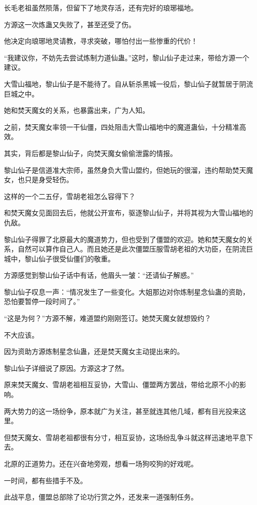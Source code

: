 \begin{this_body}
长毛老祖虽然陨落，但留下了地灵存活，还有完好的琅琊福地。

方源这一次炼蛊又失败了，甚至还受了伤。

他决定向琅琊地灵请教，寻求突破，哪怕付出一些惨重的代价！

“我建议你，不妨先去尝试炼制力道仙蛊。”这时，黎山仙子走过来，带给方源一个建议。

大雪山福地，黎山仙子是不能待了。自从斩杀黑城一役后，黎山仙子就暂居于阴流巨城之中。

她和焚天魔女的关系，也暴露出来，广为人知。

之前，焚天魔女率领一干仙僵，四处阻击大雪山福地中的魔道蛊仙，十分精准高效。

其实，背后都是黎山仙子，向焚天魔女偷偷泄露的情报。

黎山仙子是信道准大宗师，虽然身负大雪山盟约，但她玩的很溜，违约帮助焚天魔女，也只是身受轻伤。

这样的一个二五仔，雪胡老祖怎么容得下？

和焚天魔女见面回去后，他就公开宣布，驱逐黎山仙子，并将其视为大雪山福地的仇敌。

黎山仙子得罪了北原最大的魔道势力，但也受到了僵盟的欢迎。她和焚天魔女的关系，自然可以算作自己人。而且她还是此次僵盟压服雪胡老祖的大功臣，在阴流巨城中，黎山仙子很受仙僵们的敬重。

方源感觉到黎山仙子话中有话，他眉头一皱：“还请仙子解惑。”

黎山仙子叹息一声：“情况发生了一些变化。大姐那边对你炼制星念仙蛊的资助，恐怕要暂停一段时间了。”

“这是为何？”方源不解，难道盟约刚刚签订。她焚天魔女就想毁约？

不大应该。

因为资助方源炼制星念仙蛊，还是焚天魔女主动提出来的。

黎山仙子详细说了原因。方源这才了然。

原来焚天魔女、雪胡老祖相互妥协，大雪山、僵盟两方罢战，带给北原不小的影响。

两大势力的这一场纷争，原本就广为关注，甚至就连其他几域，都有目光投来这里。

但焚天魔女、雪胡老祖都很有分寸，相互妥协，这场纷乱争斗就这样迅速地平息下去。

北原的正道势力。还在兴奋地旁观，想看一场狗咬狗的好戏呢。

一时间，都有些措手不及。

此战平息，僵盟总部除了论功行赏之外，还发来一道强制任务。


\end{this_body}
